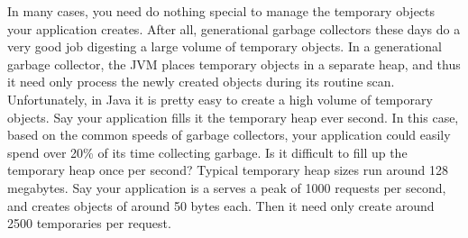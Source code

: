 In many cases, you need do nothing special to manage the temporary objects your
application creates. After all, generational garbage collectors these days do a
very good job digesting a large volume of temporary objects. In a generational
garbage collector, the JVM places temporary objects in a separate heap, and
thus it need only process the newly created objects during its routine scan.
Unfortunately, in Java it is pretty easy to create a high volume of temporary
objects. Say your application 
fills it the temporary heap ever second. In this case, based on the common
speeds of garbage collectors, your application could easily spend over 20\% of its time
collecting garbage.
Is it difficult to fill up the temporary heap once per second? Typical
temporary heap sizes run around 128 megabytes. Say your application is a serves
a peak of 1000 requests per second, and creates objects of around 50 bytes each.
Then it need only create around 2500 temporaries per request. 



